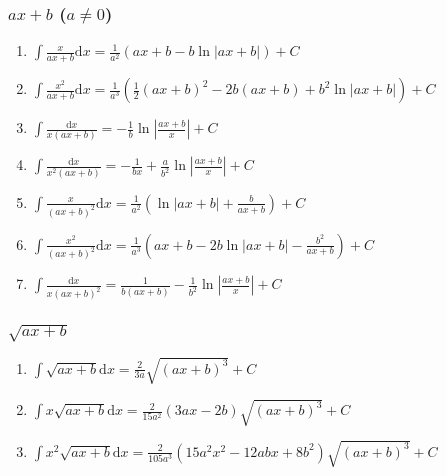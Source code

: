 \newcommand{\md}{\mathrm{d}}
\newcommand{\me}{\mathrm{e}}

\begin{tiny}

\subsubsection{$ax+b$ ($a\neq 0$)}
\begin{enumerate}[noitemsep]

\item $ \int \frac{x}{ax+b} \md x = \frac{1}{a^2} (ax+b-b\ln|ax+b|) + C $

\item $ \int \frac{x^2}{ax+b} \md x = \frac{1}{a^3} \left( \frac{1}{2}(ax+b)^2-2b(ax+b)+b^2\ln|ax+b| \right) + C $

\item $ \int \frac{\md x}{x(ax+b)} = -\frac{1}{b}\ln \left| \frac{ax+b}{x} \right| + C $

\item $ \int \frac{\md x}{x^2(ax+b)} = -\frac{1}{bx} + \frac{a}{b^2}\ln\left| \frac{ax+b}{x} \right| + C $

\item $ \int \frac{x}{(ax+b)^2} \md x = \frac{1}{a^2}\left( \ln|ax+b|+\frac{b}{ax+b} \right) + C $

\item $ \int \frac{x^2}{(ax+b)^2}\md x = \frac{1}{a^3} \left( ax+b-2b\ln|ax+b|-\frac{b^2}{ax+b} \right) + C $

\item $ \int \frac{\md x}{x(ax+b)^2} = \frac{1}{b(ax+b)} - \frac{1}{b^2}\ln\left| \frac{ax+b}{x} \right| + C $

\end{enumerate}

\subsubsection{$\sqrt{ax+b}$}

\begin{enumerate}[noitemsep]

\item $ \int \sqrt{ax+b} \mathrm{d}x = \frac{2}{3a} \sqrt{(ax+b)^3} + C $

\item $ \int x \sqrt{ax+b} \mathrm{d}x = \frac{2}{15a^2}(3ax-2b) \sqrt{(ax+b)^3} + C $

\item $ \int x^2 \sqrt{ax+b} \mathrm{d}x = \frac{2}{105a^3}(15a^2x^2-12abx+8b^2)\sqrt{(ax+b)^3} + C $


\end{enumerate}
\end{tiny}
